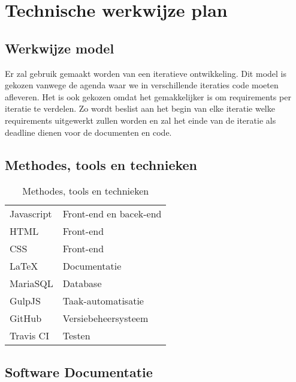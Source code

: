\section{Technische werkwijze plan}

\subsection{Werkwijze model}

Er zal gebruik gemaakt worden van een iteratieve ontwikkeling. Dit model is gekozen vanwege de agenda waar we in verschillende iteraties code moeten afleveren. Het is ook gekozen omdat het gemakkelijker is om requirements per iteratie te verdelen. Zo wordt beslist aan het begin van elke iteratie welke requirements uitgewerkt zullen worden en zal het einde van de iteratie als deadline dienen voor de documenten en code.

\subsection{Methodes, tools en technieken}

\begin{table}[h]
\begin{tabular}{ll}
Javascript & Front-end en bacek-end \\
HTML & Front-end\\
CSS & Front-end \\
LaTeX & Documentatie \\
MariaSQL  & Database            \\
GulpJS    & Taak-automatisatie  \\
GitHub    & Versiebeheersysteem \\
Travis CI & Testen    
\end{tabular}
\caption{Methodes, tools en technieken}
\label{tab:mtt}
\end{table}



\subsection{Software Documentatie}

